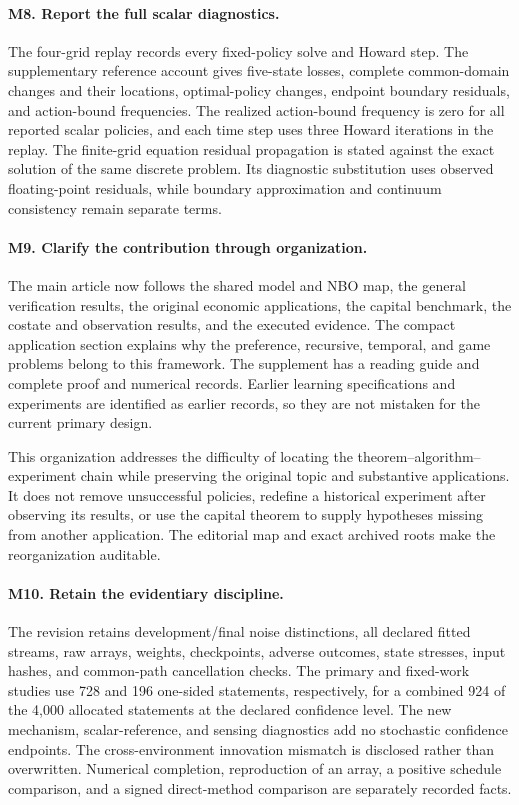 \paragraph*{M8. Report the full scalar diagnostics.}
The four-grid replay records every fixed-policy solve and Howard step. The supplementary reference account gives five-state losses, complete common-domain changes and their locations, optimal-policy changes, endpoint boundary residuals, and action-bound frequencies. The realized action-bound frequency is zero for all reported scalar policies, and each time step uses three Howard iterations in the replay. The finite-grid equation residual propagation is stated against the exact solution of the same discrete problem. Its diagnostic substitution uses observed floating-point residuals, while boundary approximation and continuum consistency remain separate terms.

\paragraph*{M9. Clarify the contribution through organization.}
The main article now follows the shared model and NBO map, the general verification results, the original economic applications, the capital benchmark, the costate and observation results, and the executed evidence. The compact application section explains why the preference, recursive, temporal, and game problems belong to this framework. The supplement has a reading guide and complete proof and numerical records. Earlier learning specifications and experiments are identified as earlier records, so they are not mistaken for the current primary design.

This organization addresses the difficulty of locating the theorem--algorithm--experiment chain while preserving the original topic and substantive applications. It does not remove unsuccessful policies, redefine a historical experiment after observing its results, or use the capital theorem to supply hypotheses missing from another application. The editorial map and exact archived roots make the reorganization auditable.

\paragraph*{M10. Retain the evidentiary discipline.}
The revision retains development/final noise distinctions, all declared fitted streams, raw arrays, weights, checkpoints, adverse outcomes, state stresses, input hashes, and common-path cancellation checks. The primary and fixed-work studies use 728 and 196 one-sided statements, respectively, for a combined 924 of the 4,000 allocated statements at the declared confidence level. The new mechanism, scalar-reference, and sensing diagnostics add no stochastic confidence endpoints. The cross-environment innovation mismatch is disclosed rather than overwritten. Numerical completion, reproduction of an array, a positive schedule comparison, and a signed direct-method comparison are separately recorded facts.

